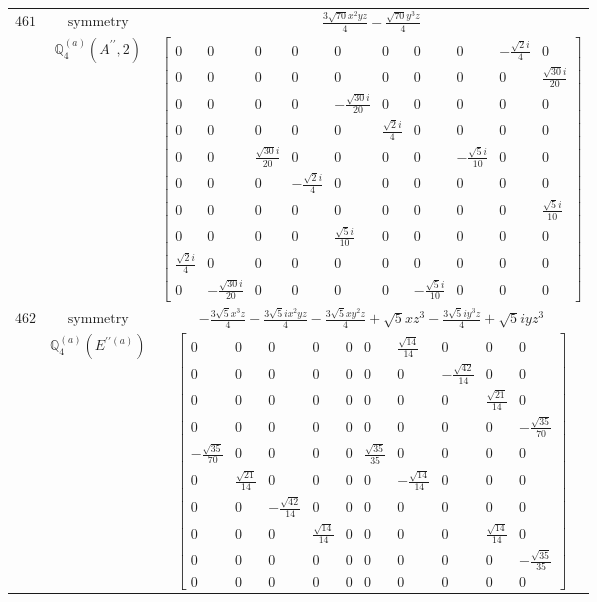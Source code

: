 \documentclass[fleqn,8pt,landscape]{jsarticle}
\begin{document}
\begin{longtable}{ccc}
$ 461 $ & $ \text{symmetry} $ & $ \frac{3 \sqrt{70} x^{2} y z}{4} - \frac{\sqrt{70} y^{3} z}{4} $ \\
$  $ & $ \mathbb{Q}_{4}^{(a)}(A^{\prime\prime},2) $ & $ \begin{bmatrix} 0 & 0 & 0 & 0 & 0 & 0 & 0 & 0 & - \frac{\sqrt{2} i}{4} & 0 \\ 0 & 0 & 0 & 0 & 0 & 0 & 0 & 0 & 0 & \frac{\sqrt{30} i}{20} \\ 0 & 0 & 0 & 0 & - \frac{\sqrt{30} i}{20} & 0 & 0 & 0 & 0 & 0 \\ 0 & 0 & 0 & 0 & 0 & \frac{\sqrt{2} i}{4} & 0 & 0 & 0 & 0 \\ 0 & 0 & \frac{\sqrt{30} i}{20} & 0 & 0 & 0 & 0 & - \frac{\sqrt{5} i}{10} & 0 & 0 \\ 0 & 0 & 0 & - \frac{\sqrt{2} i}{4} & 0 & 0 & 0 & 0 & 0 & 0 \\ 0 & 0 & 0 & 0 & 0 & 0 & 0 & 0 & 0 & \frac{\sqrt{5} i}{10} \\ 0 & 0 & 0 & 0 & \frac{\sqrt{5} i}{10} & 0 & 0 & 0 & 0 & 0 \\ \frac{\sqrt{2} i}{4} & 0 & 0 & 0 & 0 & 0 & 0 & 0 & 0 & 0 \\ 0 & - \frac{\sqrt{30} i}{20} & 0 & 0 & 0 & 0 & - \frac{\sqrt{5} i}{10} & 0 & 0 & 0 \end{bmatrix} $ \\ \hline
$ 462 $ & $ \text{symmetry} $ & $ - \frac{3 \sqrt{5} x^{3} z}{4} - \frac{3 \sqrt{5} i x^{2} y z}{4} - \frac{3 \sqrt{5} x y^{2} z}{4} + \sqrt{5} x z^{3} - \frac{3 \sqrt{5} i y^{3} z}{4} + \sqrt{5} i y z^{3} $ \\
$  $ & $ \mathbb{Q}_{4}^{(a)}(E^{\prime\prime(a)}) $ & $ \begin{bmatrix} 0 & 0 & 0 & 0 & 0 & 0 & \frac{\sqrt{14}}{14} & 0 & 0 & 0 \\ 0 & 0 & 0 & 0 & 0 & 0 & 0 & - \frac{\sqrt{42}}{14} & 0 & 0 \\ 0 & 0 & 0 & 0 & 0 & 0 & 0 & 0 & \frac{\sqrt{21}}{14} & 0 \\ 0 & 0 & 0 & 0 & 0 & 0 & 0 & 0 & 0 & - \frac{\sqrt{35}}{70} \\ - \frac{\sqrt{35}}{70} & 0 & 0 & 0 & 0 & \frac{\sqrt{35}}{35} & 0 & 0 & 0 & 0 \\ 0 & \frac{\sqrt{21}}{14} & 0 & 0 & 0 & 0 & - \frac{\sqrt{14}}{14} & 0 & 0 & 0 \\ 0 & 0 & - \frac{\sqrt{42}}{14} & 0 & 0 & 0 & 0 & 0 & 0 & 0 \\ 0 & 0 & 0 & \frac{\sqrt{14}}{14} & 0 & 0 & 0 & 0 & \frac{\sqrt{14}}{14} & 0 \\ 0 & 0 & 0 & 0 & 0 & 0 & 0 & 0 & 0 & - \frac{\sqrt{35}}{35} \\ 0 & 0 & 0 & 0 & 0 & 0 & 0 & 0 & 0 & 0 \end{bmatrix} $ \\ \hline

\end{longtable}
\end{document}
